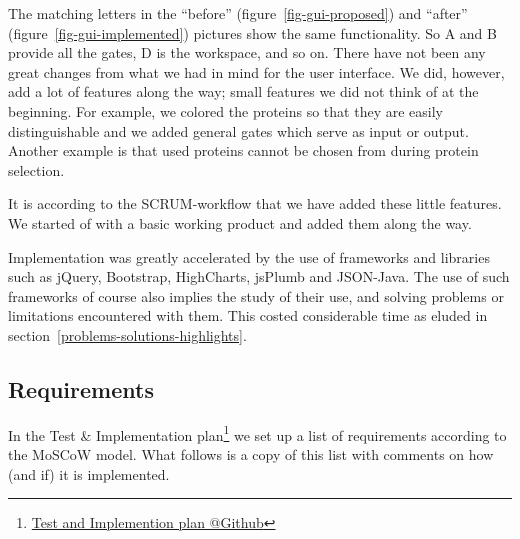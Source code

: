 \documentclass[a4paper]{article}
\makeatletter
\newcommand{\urlTestImplementation}{https://github.com/FelixAkk/synthbio/raw/master/deliverables/test-implementation/test-implementation.pdf}
\newcommand{\hrefTestImplementation}{\href{\urlTestImplementation}{Test and Implemention plan @Github}}
\makeatother
\begin{document}
The matching letters in the ``before'' (figure~\ref{fig-gui-proposed}) and ``after'' (figure~\ref{fig-gui-implemented}) pictures show the same functionality. So A and B provide all the gates, D is the workspace, and so on. There have not been any great changes from what we had in mind for the user interface. We did, however, add a lot of features along the way; small features we did not think of at the beginning. For example, we colored the proteins so that they are easily distinguishable and we added general gates which serve as input or output. Another example is that used proteins cannot be chosen from during protein selection.

It is according to the SCRUM-workflow that we have added these little features. We started of with a basic working product and added them along the way.

Implementation was greatly accelerated by the use of frameworks and libraries such as jQuery, Bootstrap, HighCharts, jsPlumb and JSON-Java. The use of such frameworks of course also implies the study of their use, and solving problems or limitations encountered with them. This costed considerable time as eluded in section~\ref{problems-solutions-highlights}.
\newpage
\subsection{Requirements}
In the Test \& Implementation plan\footnote{\hrefTestImplementation} we set up a list of requirements according to the MoSCoW model. What follows is a copy of this list with comments on how (and if) it is implemented.
\end{document}
